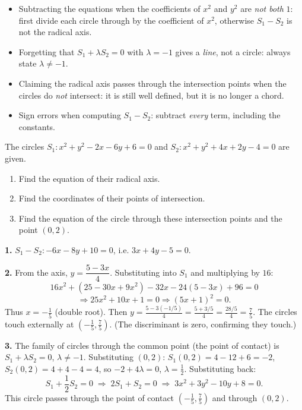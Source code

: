 \documentclass[11pt]{article}
\begin{document}
\begin{attention}
\begin{itemize}
\item Subtracting the equations when the coefficients of $x^{2}$ and $y^{2}$ are \emph{not both} $1$: first divide each circle through by the coefficient of $x^{2}$, otherwise $S_{1}-S_{2}$ is not the radical axis.
\item Forgetting that $S_{1}+\lambda S_{2}=0$ with $\lambda=-1$ gives a \emph{line}, not a circle: always state $\lambda\neq-1$.
\item Claiming the radical axis passes through the intersection points when the circles do \emph{not} intersect: it is still well defined, but it is no longer a chord.
\item Sign errors when computing $S_{1}-S_{2}$: subtract \emph{every} term, including the constants.
\end{itemize}
\end{attention}

\begin{exercice}
The circles $S_{1}: x^{2}+y^{2}-2x-6y+6=0$ and $S_{2}: x^{2}+y^{2}+4x+2y-4=0$ are given.
\begin{enumerate}
\item Find the equation of their radical axis.
\item Find the coordinates of their points of intersection.
\item Find the equation of the circle through these intersection points and the point $(0,2)$.
\end{enumerate}
\end{exercice}

\begin{corrige}[Exercise 1]
\textbf{1.} $S_{1}-S_{2}: -6x-8y+10=0$, i.e. $3x+4y-5=0$.

\textbf{2.} From the axis, $y=\dfrac{5-3x}{4}$. Substituting into $S_{1}$ and multiplying by $16$:
\[
16x^{2}+(25-30x+9x^{2})-32x-24(5-3x)+96=0
\]
\[
\Longrightarrow 25x^{2}+10x+1=0 \Longrightarrow (5x+1)^{2}=0.
\]
Thus $x=-\frac{1}{5}$ (double root). Then $y=\frac{5-3(-1/5)}{4}=\frac{5+3/5}{4}=\frac{28/5}{4}=\frac{7}{5}$.
The circles touch externally at $\left(-\frac{1}{5},\frac{7}{5}\right)$. (The discriminant is zero, confirming they touch.)

\textbf{3.} The family of circles through the common point (the point of contact) is $S_{1}+\lambda S_{2}=0$, $\lambda\neq-1$. Substituting $(0,2)$: $S_{1}(0,2)=4-12+6=-2$, $S_{2}(0,2)=4+4-4=4$, so $-2+4\lambda=0$, $\lambda=\frac{1}{2}$. Substituting back:
\[
S_{1}+\frac{1}{2}S_{2}=0 \;\Longrightarrow\; 2S_{1}+S_{2}=0 \;\Longrightarrow\; 3x^{2}+3y^{2}-10y+8=0.
\]
This circle passes through the point of contact $\left(-\frac{1}{5},\frac{7}{5}\right)$ and through $(0,2)$.
\end{corrige}
\end{document}
